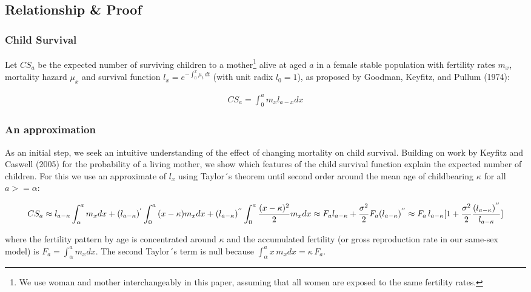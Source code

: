 \documentclass[
]{article}
\begin{document}
\hypertarget{relationship-proof}{%
\subsection{Relationship \& Proof}\label{relationship-proof}}

\hypertarget{child-survival}{%
\subsubsection{Child Survival}\label{child-survival}}

Let \(CS_a\) be the expected number of surviving children to a
mother\footnote{We use woman and mother interchangeably in this paper,
  assuming that all women are exposed to the same fertility rates.}
alive at aged \(a\) in a female stable population with fertility rates
\(m_{x}\), mortality hazard \(\mu_{x}\) and survival function
\(l_x=e^{-\int_{0}^{x}{\mu_t}\,dt}\) (with unit radix \(l_0=1\)), as
proposed by Goodman, Keyfitz, and Pullum (1974):

\[
\begin{aligned}
CS_a = \int_{0}^a{m_{x}l_{a-x}dx}
\end{aligned}
\]

\hypertarget{an-approximation}{%
\subsubsection{An approximation}\label{an-approximation}}

As an initial step, we seek an intuitive understanding of the effect of
changing mortality on child survival. Building on work by Keyfitz and
Caswell (2005) for the probability of a living mother, we show which
features of the child survival function explain the expected number of
children. For this we use an approximate of \(l_x\) using Taylor´s
theorem until second order around the mean age of childbearing
\(\kappa\) for all \(a>=\alpha\):

\[CS_a \approx l_{a-\kappa} \int_{\alpha}^a{m_{x}dx}+(l_{a-\kappa})^{'}\int_{0}^a{(x-\kappa)m_{x}dx}+
(l_{a-\kappa})^{''}\int_{0}^a{\frac{(x-\kappa)^2}{2} m_{x}dx}\\
  \approx F_a l_{a-\kappa} + \frac{\sigma^2}{2}F_a (l_{a-\kappa})^{''}\\
  \approx F_a \, l_{a-\kappa}[1+\frac{\sigma^2}{2}\frac{(l_{a-\kappa})^{''}}{l_{a-\kappa}}]\]

where the fertility pattern by age is concentrated around \(\kappa\) and
the accumulated fertility (or gross reproduction rate in our same-sex
model) is \(F_a = \int_{\alpha}^a{m_{x}dx}\). The second Taylor´s term
is null because \(\int_{\alpha}^a{x \, m_{x}dx} = \kappa \, F_a\).
\end{document}
